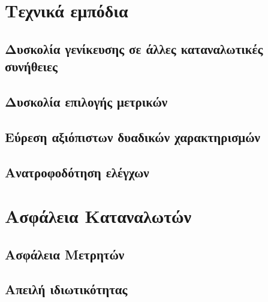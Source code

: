 \section{Τεχνικά εμπόδια}
\subsection{Δυσκολία γενίκευσης σε άλλες καταναλωτικές συνήθειες}
\subsection{Δυσκολία επιλογής μετρικών}
\subsection{Εύρεση αξιόπιστων δυαδικών χαρακτηρισμών}
\subsection{Ανατροφοδότηση ελέγχων}
\section{Ασφάλεια Καταναλωτών}
\subsection{Ασφάλεια Μετρητών}
\subsection{Απειλή ιδιωτικότητας}
